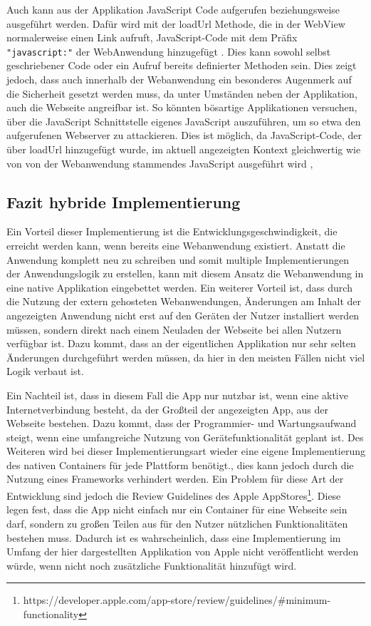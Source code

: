 Auch kann aus der Applikation JavaScript Code aufgerufen beziehungsweise ausgeführt werden. Dafür wird mit der loadUrl Methode, die in der WebView normalerweise einen Link aufruft, JavaScript-Code mit dem Präfix \verb|"javascript:"| der WebAnwendung hinzugefügt \cite{webview_javascript_security}. Dies kann sowohl selbst geschriebener Code oder ein Aufruf bereits definierter Methoden sein. Dies zeigt jedoch, dass auch innerhalb der Webanwendung ein besonderes Augenmerk auf die Sicherheit gesetzt werden muss, da unter Umständen neben der Applikation, auch die Webseite angreifbar ist. So könnten bösartige Applikationen versuchen, über die JavaScript Schnittstelle eigenes JavaScript auszuführen, um so etwa den aufgerufenen Webserver zu attackieren. Dies ist möglich, da JavaScript-Code, der über loadUrl hinzugefügt wurde, im aktuell angezeigten Kontext gleichwertig wie von von der Webanwendung stammendes JavaScript ausgeführt wird \cite{webview_javascript_security},

\subsection{Fazit hybride Implementierung}
Ein Vorteil dieser Implementierung ist die Entwicklungsgeschwindigkeit, die erreicht werden kann, wenn bereits eine Webanwendung existiert. Anstatt die Anwendung komplett neu zu schreiben und somit multiple Implementierungen der Anwendungslogik zu erstellen, kann mit diesem Ansatz die Webanwendung in eine native Applikation eingebettet werden.
Ein weiterer Vorteil ist, dass durch die Nutzung der extern gehosteten Webanwendungen, Änderungen am Inhalt der angezeigten Anwendung nicht erst auf den Geräten der Nutzer installiert werden müssen, sondern direkt nach einem Neuladen der Webseite bei allen Nutzern verfügbar ist. 
Dazu kommt, dass an der eigentlichen Applikation nur sehr selten Änderungen durchgeführt werden müssen, da hier in den meisten Fällen nicht viel Logik verbaut ist.

Ein Nachteil ist, dass in diesem Fall die App nur nutzbar ist, wenn eine aktive Internetverbindung besteht, da der Großteil der angezeigten App, aus der Webseite bestehen. Dazu kommt, dass der Programmier- und Wartungsaufwand steigt, wenn eine umfangreiche Nutzung von Gerätefunktionalität geplant ist. Des Weiteren wird bei dieser Implementierungsart wieder eine eigene Implementierung des nativen Containers für jede Plattform benötigt., dies kann jedoch durch die Nutzung eines Frameworks verhindert werden. Ein Problem für diese Art der Entwicklung sind jedoch die Review Guidelines des Apple AppStores\footnote{https://developer.apple.com/app-store/review/guidelines/\#minimum-functionality}. Diese legen fest, dass die App nicht einfach nur ein Container für eine Webseite sein darf, sondern zu großen Teilen aus für den Nutzer nützlichen Funktionalitäten bestehen muss. Dadurch ist es wahrscheinlich, dass eine Implementierung im Umfang der hier dargestellten Applikation von Apple nicht veröffentlicht werden würde, wenn nicht noch zusätzliche Funktionalität hinzufügt wird.

